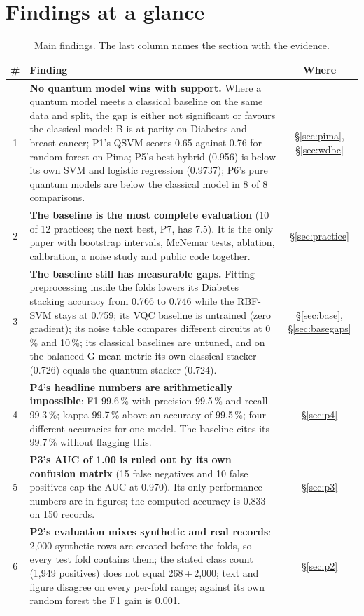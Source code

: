 \documentclass[11pt,a4paper]{article}
\newcommand{\BAD}[1]{\textcolor{bad}{\textbf{#1}}}
\begin{document}
\section{Findings at a glance}
\label{sec:glance}
\begin{table}[H]
\centering\footnotesize
\caption{Main findings. The last column names the section with the evidence.}
\label{tab:glance}
\begin{tabularx}{\textwidth}{c Y c}
\toprule
\# & Finding & Where \\
 & \textbf{No quantum model wins with support.} Where a quantum model meets a classical baseline on the same data and split, the gap is either not significant or favours the classical model: B is at parity on Diabetes and breast cancer; P1's QSVM scores 0.65 against 0.76 for random forest on Pima; P5's best hybrid (0.956) is below its own SVM and logistic regression (0.9737); P6's pure quantum models are below the classical model in 8 of 8 comparisons. & \S\ref{sec:pima}, \S\ref{sec:wdbc} \\
2 & \textbf{The baseline is the most complete evaluation} (10 of 12 practices; the next best, P7, has 7.5). It is the only paper with bootstrap intervals, McNemar tests, ablation, calibration, a noise study and public code together. & \S\ref{sec:practice} \\
3 & \textbf{The baseline still has measurable gaps.} Fitting preprocessing inside the folds lowers its Diabetes stacking accuracy from 0.766 to 0.746 while the RBF-SVM stays at 0.759; its VQC baseline is untrained (zero gradient); its noise table compares different circuits at 0\,\% and 10\,\%; its classical baselines are untuned, and on the balanced G-mean metric its own classical stacker (0.726) equals the quantum stacker (0.724). & \S\ref{sec:base}, \S\ref{sec:basegaps} \\
4 & \BAD{P4's headline numbers are arithmetically impossible}: F1 99.6\,\% with precision 99.5\,\% and recall 99.3\,\%; kappa 99.7\,\% above an accuracy of 99.5\,\%; four different accuracies for one model. The baseline cites its 99.7\,\% without flagging this. & \S\ref{sec:p4} \\
5 & \BAD{P3's AUC of 1.00 is ruled out by its own confusion matrix} (15 false negatives and 10 false positives cap the AUC at 0.970). Its only performance numbers are in figures; the computed accuracy is 0.833 on 150 records. & \S\ref{sec:p3} \\
6 & \BAD{P2's evaluation mixes synthetic and real records}: 2,000 synthetic rows are created before the folds, so every test fold contains them; the stated class count (1,949 positives) does not equal 268\,+\,2,000; text and figure disagree on every per-fold range; against its own random forest the F1 gain is 0.001. & \S\ref{sec:p2} \\

\end{tabularx}
\end{table}
\end{document}
